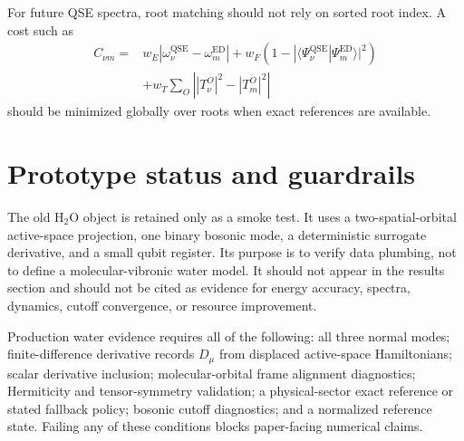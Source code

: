 \documentclass[
  reprint,
  amsmath,
  amssymb,
  aps,
  pra,
  nofootinbib,
  superscriptaddress,
  floatfix
]{revtex4-2}
\newcommand{\braket}[2]{\langle #1|#2\rangle}
\newcommand{\qse}{\mathrm{QSE}}
\newcommand{\ed}{\mathrm{ED}}
\newcommand{\HtwoO}{\mathrm{H_2O}}
\begin{document}
For future QSE spectra, root matching should not rely on sorted root index.  A cost such as
\begin{align}
C_{\nu m}
={}&
w_E|\omega_\nu^{\qse}-\omega_m^{\ed}|
+
w_F\left(1-|\braket{\Psi_\nu^{\qse}}{\Psi_m^{\ed}}|^2\right)
\nonumber\\
&+
w_T\sum_O
\left|
|T_\nu^O|^2-|T_m^O|^2
\right|
\label{eq:root_matching_cost}
\end{align}
should be minimized globally over roots when exact references are available.

\section{Prototype status and guardrails}
\label{app:prototype_guardrails}

The old \(\HtwoO\) object is retained only as a smoke test.  It uses a two-spatial-orbital active-space projection, one binary bosonic mode, a deterministic surrogate derivative, and a small qubit register.  Its purpose is to verify data plumbing, not to define a molecular-vibronic water model.  It should not appear in the results section and should not be cited as evidence for energy accuracy, spectra, dynamics, cutoff convergence, or resource improvement.

Production water evidence requires all of the following: all three normal modes; finite-difference derivative records \(D_\mu\) from displaced active-space Hamiltonians; scalar derivative inclusion; molecular-orbital frame alignment diagnostics; Hermiticity and tensor-symmetry validation; a physical-sector exact reference or stated fallback policy; bosonic cutoff diagnostics; and a normalized reference state.  Failing any of these conditions blocks paper-facing numerical claims.
\end{document}
